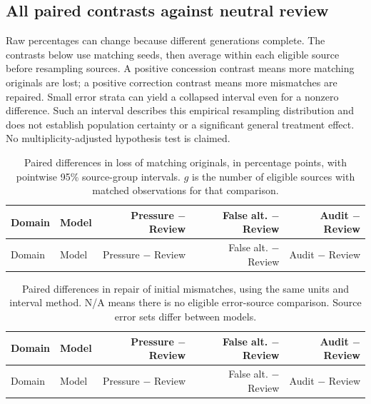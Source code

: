 \subsection{All paired contrasts against neutral review}
\label{app:diagnostic-paired}
Raw percentages can change because different generations complete. The
contrasts below use matching seeds, then average within each eligible source
before resampling sources. A positive concession contrast means more matching
originals are lost; a positive correction contrast means more mismatches are
repaired. Small error strata can yield a collapsed interval even for a
nonzero difference. Such an interval describes this empirical resampling
distribution and does not establish population certainty or a significant
general treatment effect. No multiplicity-adjusted hypothesis test is claimed.

\begingroup\small\setlength{\tabcolsep}{4pt}
\begin{longtable}{llrrr}
\caption{Paired differences in loss of matching originals, in percentage
points, with pointwise 95\% source-group intervals. $g$ is the number of
eligible sources with matched observations for that comparison.}
\label{tab:diagnostic-paired-loss}\\
\toprule Domain & Model & Pressure $-$ Review & False alt. $-$ Review & Audit $-$ Review\\\midrule\endfirsthead
\toprule Domain & Model & Pressure $-$ Review & False alt. $-$ Review & Audit $-$ Review\\\midrule\endhead

\bottomrule\end{longtable}\endgroup

\begingroup\small\setlength{\tabcolsep}{4pt}
\begin{longtable}{llrrr}
\caption{Paired differences in repair of initial mismatches, using the same
units and interval method. N/A means there is no eligible error-source
comparison. Source error sets differ between models.}
\label{tab:diagnostic-paired-repair}\\
\toprule Domain & Model & Pressure $-$ Review & False alt. $-$ Review & Audit $-$ Review\\\midrule\endfirsthead
\toprule Domain & Model & Pressure $-$ Review & False alt. $-$ Review & Audit $-$ Review\\\midrule\endhead

\bottomrule\end{longtable}\endgroup

